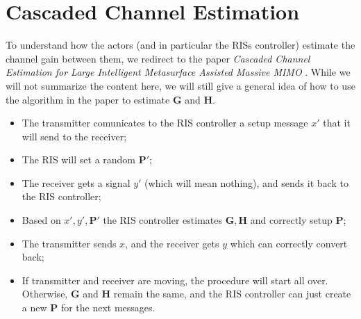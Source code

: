 \newpage
\section{Cascaded Channel Estimation}
To understand how the actors (and in particular the RISs controller) estimate the channel gain between them, we redirect to the paper \textit{Cascaded Channel Estimation for Large Intelligent Metasurface Assisted Massive MIMO} \cite{8879620}. While we will not summarize the content here, we will still give a general idea of how to use the algorithm in the paper to estimate $\bm{G}$ and $\bm{H}$.
\begin{itemize}
  \item The transmitter comunicates to the RIS controller a setup message $x'$ that it will send to the receiver;
  \item The RIS will set a random $\bm{P}'$; %
  \item The receiver gets a signal $y'$ (which will mean nothing), and sends it back to the RIS controller;
  \item Based on $x', y', \bm{P}'$ the RIS controller estimates $\bm{G}, \bm{H}$ and correctly setup $\bm{P}$;
  \item The transmitter sends $x$, and the receiver gets $y$ which can correctly convert back;
  \item If transmitter and receiver are moving, the procedure will start all over. Otherwise, $\bm{G}$ and $\bm{H}$ remain the same, and the RIS controller can just create a new $\bm{P}$ for the next messages.
\end{itemize}
